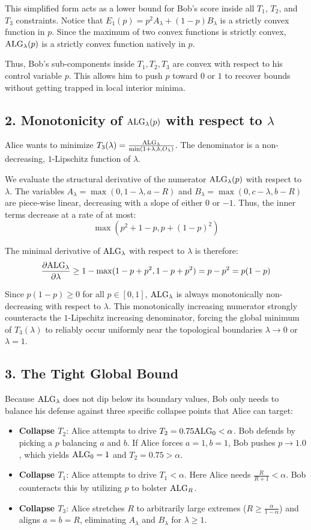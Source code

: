 \documentclass[11pt]{article}
\newcommand{\ALG}{\textnormal{ALG}}
\begin{document}
This simplified form acts as a lower bound for Bob's score inside all $T_1$, $T_2$, and $T_3$ constraints. Notice that $E_1(p) = p^2 A_\lambda + (1-p) B_\lambda$ is a strictly convex function in $p$. Since the maximum of two convex functions is strictly convex, $\ALG_\lambda(p)$ is a strictly convex function natively in $p$.

Thus, Bob's sub-components inside $T_1, T_2, T_3$ are convex with respect to his control variable $p$. This allows him to push $p$ toward $0$ or $1$ to recover bounds without getting trapped in local interior minima.

\subsection{2. Monotonicity of $\ALG_\lambda(p)$ with respect to $\lambda$}
Alice wants to minimize $T_3(\lambda) = \frac{\ALG_\lambda}{\min(1+\lambda, b, O_\lambda)}$. The denominator is a non-decreasing, $1$-Lipschitz function of $\lambda$.

We evaluate the structural derivative of the numerator $\ALG_\lambda(p)$ with respect to $\lambda$. The variables $A_\lambda = \max(0, 1-\lambda, a-R)$ and $B_\lambda = \max(0, c-\lambda, b-R)$ are piece-wise linear, decreasing with a slope of either $0$ or $-1$. Thus, the inner terms decrease at a rate of at most:
\[ \max(p^2 + 1 - p, p + (1-p)^2) \]

The minimal derivative of $\ALG_\lambda$ with respect to $\lambda$ is therefore:
\[ \frac{\partial \ALG_\lambda}{\partial \lambda} \ge 1 - \max(1 - p + p^2, 1 - p + p^2) = p - p^2 = p(1-p) \]

Since $p(1 - p) \ge 0$ for all $p \in [0, 1]$, $\ALG_\lambda$ is always monotonically non-decreasing with respect to $\lambda$. This monotonically increasing numerator strongly counteracts the $1$-Lipschitz increasing denominator, forcing the global minimum of $T_3(\lambda)$ to reliably occur uniformly near the topological boundaries $\lambda \to 0$ or $\lambda = 1$.

\subsection{3. The Tight Global Bound}
Because $\ALG_\lambda$ does not dip below its boundary values, Bob only needs to balance his defense against three specific collapse points that Alice can target:
\begin{itemize}
    \item \textbf{Collapse $T_2$}: Alice attempts to drive $T_2 = 0.75 \ALG_0 < \alpha$. Bob defends by picking a $p$ balancing $a$ and $b$. If Alice forces $a=1, b=1$, Bob pushes $p \to 1.0$, which yields $\ALG_0 = 1$ and $T_2 = 0.75 > \alpha$.
    \item \textbf{Collapse $T_1$}: Alice attempts to drive $T_1 < \alpha$. Here Alice needs $\frac{R}{R+1} < \alpha$. Bob counteracts this by utilizing $p$ to bolster $\ALG_R$.
    \item \textbf{Collapse $T_3$}: Alice stretches $R$ to arbitrarily large extremes ($R \ge \frac{\alpha}{1-\alpha}$) and aligns $a = b = R$, eliminating $A_\lambda$ and $B_\lambda$ for $\lambda \ge 1$.
\end{itemize}
\end{document}
